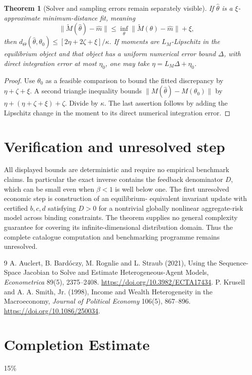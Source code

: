 \documentclass[11pt]{article}
\newtheorem{theorem}{Theorem}
\theoremstyle{remark}
\begin{document}
\begin{theorem}[Solver and sampling errors remain separately visible]
If $\widehat\theta$ is a $\xi$-approximate minimum-distance fit, meaning
\[
 \|\widetilde M(\widehat\theta)-\widehat m\|
 \leq\inf_\theta\|\widetilde M(\theta)-\widehat m\|+\xi,
\]
then
$d_\Theta(\widehat\theta,\theta_0)\leq
 [2\eta+2\zeta+\xi]/\kappa$.
If moments are $L_M$-Lipschitz in the equilibrium object and that object
has a uniform numerical error bound $\Delta$, with direct integration
error at most $\eta_0$, one may take $\eta=L_M\Delta+\eta_0$.
\end{theorem}
\begin{proof}
Use $\theta_0$ as a feasible comparison to bound the fitted discrepancy
by $\eta+\zeta+\xi$. A second triangle inequality bounds
$\|M(\widehat\theta)-M(\theta_0)\|$ by
$\eta+(\eta+\zeta+\xi)+\zeta$. Divide by $\kappa$.
The last assertion follows by adding the Lipschitz change in the moment
to its direct numerical integration error.
\end{proof}

\section{Verification and unresolved step}
All displayed bounds are deterministic and require no empirical
benchmark claims. In particular the exact inverse contains the feedback
denominator $D$, which can be small even when $\beta<1$ is well below one.
The first unresolved economic step is construction of an equilibrium-
equivalent invariant update with certified $b,c,d$ satisfying $D>0$ for a
nontrivial globally nonlinear aggregate-risk model across binding
constraints. The theorem supplies no general complexity guarantee for
covering its infinite-dimensional distribution domain. Thus the complete
catalogue computation and benchmarking programme remains unresolved.

\begin{thebibliography}{9}
 A. Auclert, B. Bard\'oczy, M. Rognlie and L. Straub (2021),
Using the Sequence-Space Jacobian to Solve and Estimate Heterogeneous-Agent
Models, \emph{Econometrica} 89(5), 2375--2408.
\url{https://doi.org/10.3982/ECTA17434}.
 P. Krusell and A. A. Smith, Jr. (1998), Income and Wealth
Heterogeneity in the Macroeconomy, \emph{Journal of Political Economy}
106(5), 867--896. \url{https://doi.org/10.1086/250034}.
\end{thebibliography}

\section{Completion Estimate}
15\%
\end{document}
